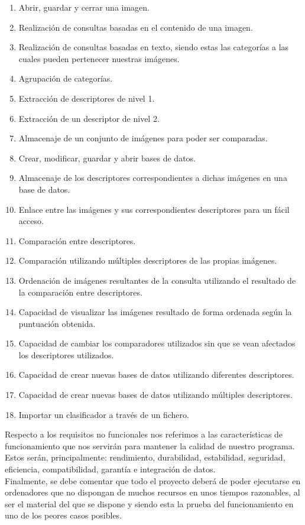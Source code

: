 \begin{enumerate}
\item Abrir, guardar y cerrar una imagen.
\item Realización de consultas basadas en el contenido de una imagen.
\item Realización de consultas basadas en texto, siendo estas las categorías a las cuales pueden pertenecer nuestras imágenes.
\item Agrupación de categorías.
\item Extracción de descriptores de nivel 1.
\item Extracción de un descriptor de nivel 2.
\item Almacenaje de un conjunto de imágenes para poder ser comparadas.
\item Crear, modificar, guardar y abrir bases de datos.
\item Almacenaje de los descriptores correspondientes a dichas imágenes en una base de datos.
\item Enlace entre las imágenes y sus correspondientes descriptores para un fácil acceso.
\item Comparación entre descriptores.
\item Comparación utilizando múltiples descriptores de las propias imágenes.
\item Ordenación de imágenes resultantes de la consulta utilizando el resultado de la comparación entre descriptores.
\item Capacidad de visualizar las imágenes resultado de forma ordenada según la puntuación obtenida.
\item Capacidad de cambiar los comparadores utilizados sin que se vean afectados los descriptores utilizados.
\item Capacidad de crear nuevas bases de datos utilizando diferentes descriptores.
\item Capacidad de crear nuevas bases de datos utilizando múltiples descriptores.
\item Importar un clasificador a través de un fichero.
\end{enumerate}
Respecto a los requisitos no funcionales nos referimos a las características de funcionamiento que nos servirán para mantener la calidad de nuestro programa. Estos serán, principalmente: rendimiento, durabilidad, estabilidad, seguridad, eficiencia, compatibilidad, garantía e integración de datos.\\

Finalmente, se debe comentar que todo el proyecto deberá de poder ejecutarse en ordenadores que no dispongan de muchos recursos en unos tiempos razonables, al ser el material del que se dispone y siendo esta la prueba del funcionamiento en uno de los peores casos posibles.

